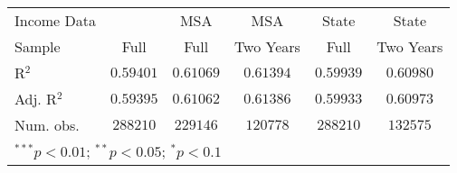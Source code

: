 \begin{tabular}{l c c c c c}
Income Data          &                  & MSA              & MSA              & State            & State            \\
Sample               & Full             & Full             & Two Years        & Full             & Two Years        \\
R$^2$                & $0.59401$        & $0.61069$        & $0.61394$        & $0.59939$        & $0.60980$        \\
Adj. R$^2$           & $0.59395$        & $0.61062$        & $0.61386$        & $0.59933$        & $0.60973$        \\
Num. obs.            & $288210$         & $229146$         & $120778$         & $288210$         & $132575$         \\
\hline
\multicolumn{6}{l}{\scriptsize{$^{***}p<0.01$; $^{**}p<0.05$; $^{*}p<0.1$}}
\end{tabular}
